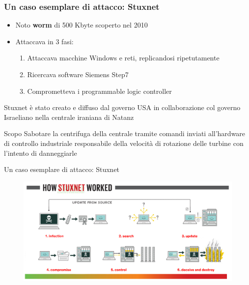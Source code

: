 
\begin{frame}
  \frametitle{Un caso esemplare di attacco: Stuxnet}
  \begin{itemize}[<+- | alert@+>]
  	\item Noto \textbf{\color{blue_slides}worm} di 500 Kbyte scoperto nel 2010 %
  	\item Attaccava in 3 fasi:
  	\begin{enumerate}[<+- | alert@+>]
  		\item Attaccava macchine Windows e reti, replicandosi ripetutamente
  		\item Ricercava software Siemens Step7 %
  		\item Comprometteva i programmable logic controller
  	\end{enumerate}
  \end{itemize}
  \pause
  \begin{block}{}
  Stuxnet è stato creato e diffuso dal governo USA in collaborazione col governo Israeliano nella centrale iraniana di Natanz
  \end{block}
  \pause
   \begin{block}{Scopo}
   	Sabotare la centrifuga della centrale tramite comandi inviati all’hardware di controllo industriale responsabile della velocità di rotazione delle turbine con l'intento di danneggiarle
   \end{block}
\end{frame}

\begin{frame}{Un caso esemplare di attacco: Stuxnet}
	\begin{figure}[h] 
		\includegraphics[scale=0.3,cfbox=blue_slides 1pt 0pt]{imgs/stuxnet_hsw.png}
	\end{figure}
\end{frame}


